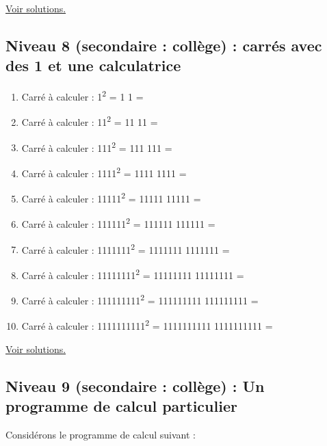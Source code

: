 \documentclass[11pt]{article}
\begin{document}
\hyperref[org4a3537c]{Voir solutions.}

\newpage


\subsection{Niveau 8 (secondaire : collège) : carrés avec des 1 et une calculatrice}
\label{sec:org6a8df91}


\label{org400e461}


\begin{enumerate}
\item Carré à calculer :  1\textsuperscript{2} = 1 \texttimes{} 1 =
\item Carré à calculer :  11\textsuperscript{2} = 11 \texttimes{} 11 =
\item Carré à calculer :  111\textsuperscript{2} = 111 \texttimes{} 111 =
\item Carré à calculer :  1111\textsuperscript{2} = 1111 \texttimes{} 1111 =
\item Carré à calculer :  11111\textsuperscript{2} = 11111 \texttimes{} 11111 =
\item Carré à calculer :  111111\textsuperscript{2} = 111111 \texttimes{} 111111 =
\item Carré à calculer :  1111111\textsuperscript{2} = 1111111 \texttimes{} 1111111 =
\item Carré à calculer :  11111111\textsuperscript{2} = 11111111 \texttimes{} 11111111 =
\item Carré à calculer :  111111111\textsuperscript{2} = 111111111 \texttimes{} 111111111 =
\item Carré à calculer :  1111111111\textsuperscript{2} = 1111111111 \texttimes{} 1111111111 =
\end{enumerate}


\hyperref[org7ee15c1]{Voir solutions.}

\newpage


\subsection{Niveau 9 (secondaire : collège) : Un programme de calcul particulier}
\label{sec:orgacc8890}

\label{org1de94a3}

Considérons le programme de calcul suivant :
\end{document}
